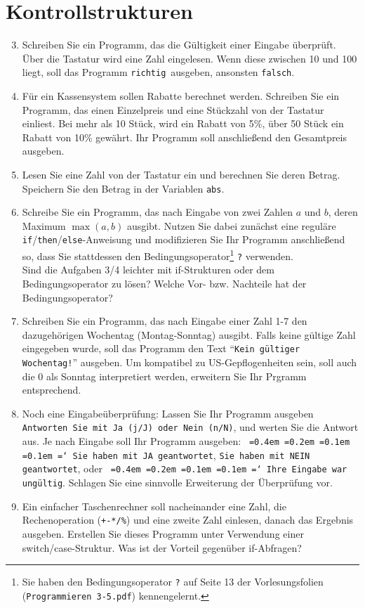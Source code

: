 \documentclass[paper=a4, fontsize=11pt, twoside]{scrartcl}
\newcommand*\justify{%
  \fontdimen2\font=0.4em%
  \fontdimen3\font=0.2em%
  \fontdimen4\font=0.1em%
  \fontdimen7\font=0.1em%
  \hyphenchar\font=`\-%
}
\begin{document}
\section*{Kontrollstrukturen}
\begin{enumerate}[resume]
\setcounter{enumi}{2}
  \item Schreiben Sie ein Programm, das die Gültigkeit einer Eingabe überprüft. Über die Tastatur wird eine Zahl eingelesen. Wenn diese zwischen 10 und 100 liegt, soll das Programm \glqq \texttt{richtig}\grqq\, ausgeben, ansonsten \glqq \texttt{falsch}\grqq.%
  \item Für ein Kassensystem sollen Rabatte berechnet werden. Schreiben Sie ein Programm, das einen Einzelpreis und eine Stückzahl von der Tastatur einliest. Bei mehr als 10 Stück, wird ein Rabatt von 5\%, über 50 Stück ein Rabatt von 10\% gewährt. Ihr Programm soll anschließend den Gesamtpreis ausgeben.
  \item Lesen Sie eine Zahl von der Tastatur ein und berechnen Sie deren Betrag. Speichern Sie den Betrag in der Variablen \texttt{abs}.
  \item Schreibe Sie ein Programm, das nach Eingabe von zwei Zahlen \(a\) und \(b\), deren Maximum \(\max(a,b)\) ausgibt. Nutzen Sie dabei zunächst eine reguläre \texttt{if}/\texttt{then}/\texttt{else}-Anweisung und modifizieren Sie Ihr Programm anschließend so, dass Sie stattdessen den Bedingungsoperator\footnote{Sie haben den Bedingungsoperator \texttt{?} auf Seite 13 der Vorlesungsfolien (\texttt{Programmieren 3-5.pdf}) kennengelernt.} \texttt{?} verwenden. \\
   Sind die Aufgaben 3/4 leichter mit if-Strukturen oder dem Bedingungsoperator zu lösen? Welche Vor- bzw. Nachteile hat der Bedingungsoperator?
  \item Schreiben Sie ein Programm, das nach Eingabe einer Zahl 1-7 den dazugehörigen Wochentag (Montag-Sonntag) ausgibt. Falls keine gültige Zahl eingegeben wurde, soll das Programm den Text ``\texttt{Kein gültiger Wochentag!}'' ausgeben. Um kompatibel zu US-Gepflogenheiten sein, soll auch die 0 als Sonntag interpretiert werden, erweitern Sie Ihr Prgramm entsprechend.
  \item Noch eine Eingabeüberprüfung: Lassen Sie Ihr Programm ausgeben \glqq \texttt{Antworten Sie mit Ja (j/J) oder Nein (n/N)}\grqq , und werten Sie die Antwort aus. Je nach Eingabe soll Ihr Programm ausgeben: \glqq \texttt{\justify Sie haben mit JA geantwortet}\grqq, \glqq \texttt{Sie haben mit NEIN geantwortet}\grqq, oder \glqq \texttt{\justify Ihre Eingabe war ungültig}\grqq. Schlagen Sie eine sinnvolle Erweiterung der Überprüfung vor.
  \item Ein einfacher Taschenrechner soll nacheinander eine Zahl, die Rechenoperation (\texttt{+-*/\%}) und eine zweite Zahl einlesen, danach das Ergebnis ausgeben. Erstellen Sie dieses Programm unter Verwendung einer switch/case-Struktur. Was ist der Vorteil gegenüber if-Abfragen?
  
\end{enumerate}
\end{document}
